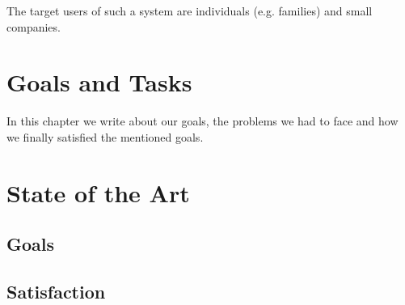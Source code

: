 The target users of such a system are individuals (e.g. families) and small companies.

\section{Goals and Tasks}

In this chapter we write about our goals, the problems we had to face and how we finally satisfied the mentioned goals.

\section{State of the Art}

\subsection{Goals}

\subsection{Satisfaction}
